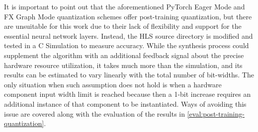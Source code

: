 It is important to point out that the aforementioned PyTorch Eager Mode and FX Graph Mode quantization schemes offer post-training quantization, but there are unsuitable for this work due to their lack of flexibility and support for the essential neural network layers. Instead, the HLS source directory is modified and tested in a C Simulation to measure accuracy. While the synthesis process could supplement the algorithm with an additional feedback signal about the precise hardware resource utilization, it takes much more than the simulation, and its results can be estimated to vary linearly with the total number of bit-widths. The only situation when such assumption does not hold is when a hardware component input width limit is reached because then a 1-bit increase requires an additional instance of that component to be instantiated. Ways of avoiding this issue are covered along with the evaluation of the results in \cref{eval:post-training-quantization}.

